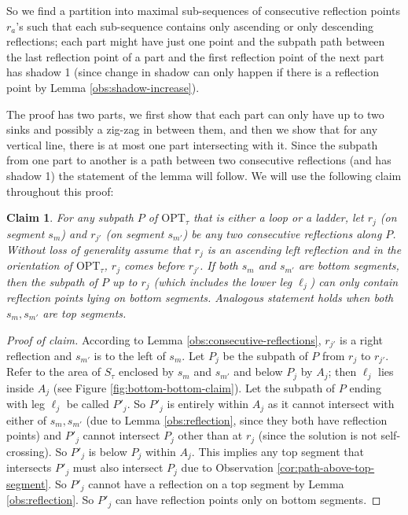 \documentclass[10pt,a4paper]{amsart}
\theoremstyle{thmstyleone}
\newtheorem{claim}{Claim} %
\newcommand{\OPT}{{\text{OPT}}}
\begin{document}
So we find a partition into maximal sub-sequences of consecutive reflection points $r_a$'s such that each sub-sequence contains only ascending or only descending reflections; each part might have just one point and the subpath path between the last reflection point of a part and the first reflection point of the next part has shadow 1 (since change in shadow can only happen if there is a reflection point by Lemma \ref{obs:shadow-increase}).

The proof has two parts, we first show that each part can only have up to two sinks and possibly a zig-zag in between them, and then we show that for any vertical line, there is at most one part intersecting with it. Since the subpath from one part to another is a path between two consecutive reflections (and has shadow 1) the statement of the lemma will follow.
We will use the following claim throughout this proof:
\begin{claim}\label{claim:bottom-bottom}
    For any subpath $P$ of $\OPT_\tau$ that is either a loop or a ladder, let $r_j$ (on segment $s_m$) and $r_{j'}$ (on segment $s_{m'}$) be any two consecutive reflections along $P$. Without loss of generality assume that $r_j$ is an ascending left reflection and in the orientation of $\OPT_\tau$, $r_j$ comes before $r_{j'}$.
    If both $s_m$ and $s_{m'}$ are bottom segments,
    then the subpath of $P$ up to $r_j$ (which  includes the lower leg $\ell_{j}$) can only contain reflection points lying on bottom segments. Analogous statement holds when both $s_m,s_{m'}$ are top segments.
\end{claim}

\begin{proof}[Proof of claim]
    According to Lemma \ref{obs:consecutive-reflections}, $r_{j'}$ is a right reflection and $s_{m'}$ is to the left of $s_m$. Let $P_j$ be the subpath of $P$ from $r_j$ to $r_{j'}$. Refer to the area of $S_\tau$ enclosed by $s_m$ and $s_{m'}$ and below $P_j$ by $A_j$; then $\ell_j$ lies inside $A_j$ (see Figure \ref{fig:bottom-bottom-claim}). 
	Let the subpath of $P$ ending with leg $\ell_j$ be called $P'_j$. So $P'_j$ is entirely within $A_j$
	as it cannot intersect with either of $s_m,s_{m'}$ (due to Lemma \ref{obs:reflection}, since they both have reflection points) and $P'_j$ cannot
	intersect $P_j$ other than at $r_j$ (since the solution is not self-crossing).
	So $P'_j$ is below $P_j$ within $A_j$. This implies any top segment that intersects $P'_j$ must also intersect $P_j$ due to Observation \ref{cor:path-above-top-segment}. So $P'_j$ cannot have a reflection on a top segment by Lemma \ref{obs:reflection}. So $P'_j$ can have
	reflection points only on bottom segments.
\end{proof}
\end{document}
